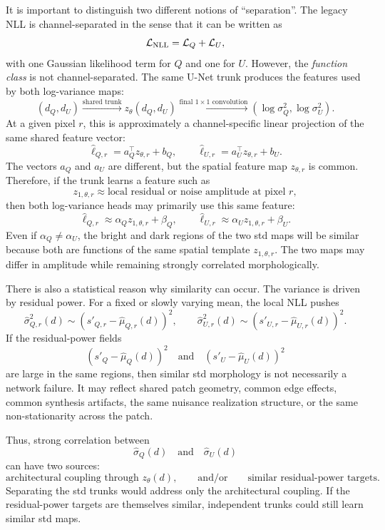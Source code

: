 \documentclass[11pt]{article}
\newcommand{\mean}{\mu}
\newcommand{\logvar}{\ell}
\newcommand{\std}{\sigma}
\newcommand{\pix}{r}
\begin{document}
It is important to distinguish two different notions of ``separation''.  The
legacy NLL is channel-separated in the sense that it can be written as
\[
  \mathcal{L}_{\rm NLL}
  =
  \mathcal{L}_{Q}
  +
  \mathcal{L}_{U},
\]
with one Gaussian likelihood term for \(Q\) and one for \(U\).  However, the
\emph{function class} is not channel-separated.  The same U-Net trunk produces
the features used by both log-variance maps:
\[
  (d_Q,d_U)
  \xrightarrow{\text{shared trunk}}
  z_\theta(d_Q,d_U)
  \xrightarrow{\text{final }1\times1\text{ convolution}}
  \left(
    \log \std_Q^2,
    \log \std_U^2
  \right).
\]
At a given pixel \(\pix\), this is approximately a channel-specific linear
projection of the same shared feature vector:
\[
  \widehat{\logvar}_{Q,\pix}
  =
  a_Q^\top z_{\theta,\pix} + b_Q,
  \qquad
  \widehat{\logvar}_{U,\pix}
  =
  a_U^\top z_{\theta,\pix} + b_U.
\]
The vectors \(a_Q\) and \(a_U\) are different, but the spatial feature map
\(z_{\theta,\pix}\) is common.  Therefore, if the trunk learns a feature such
as
\[
  z_{1,\theta,\pix}
  \approx
  \text{local residual or noise amplitude at pixel }\pix,
\]
then both log-variance heads may primarily use this same feature:
\[
  \widehat{\logvar}_{Q,\pix}
  \approx
  \alpha_Q z_{1,\theta,\pix}+\beta_Q,
  \qquad
  \widehat{\logvar}_{U,\pix}
  \approx
  \alpha_U z_{1,\theta,\pix}+\beta_U.
\]
Even if \(\alpha_Q\neq \alpha_U\), the bright and dark regions of the two std
maps will be similar because both are functions of the same spatial template
\(z_{1,\theta,\pix}\).  The two maps may differ in amplitude while remaining
strongly correlated morphologically.

There is also a statistical reason why similarity can occur.  The variance is
driven by residual power.  For a fixed or slowly varying mean, the local NLL
pushes
\[
  \widehat{\std}_{Q,\pix}^2(d)
  \sim
  \left(s'_{Q,\pix}-\widehat{\mean}_{Q,\pix}(d)\right)^2,
  \qquad
  \widehat{\std}_{U,\pix}^2(d)
  \sim
  \left(s'_{U,\pix}-\widehat{\mean}_{U,\pix}(d)\right)^2.
\]
If the residual-power fields
\[
  \left(s'_Q-\widehat{\mean}_Q(d)\right)^2
  \quad\text{and}\quad
  \left(s'_U-\widehat{\mean}_U(d)\right)^2
\]
are large in the same regions, then similar std morphology is not necessarily a
network failure.  It may reflect shared patch geometry, common edge effects,
common synthesis artifacts, the same nuisance realization structure, or the
same non-stationarity across the patch.

Thus, strong correlation between
\[
  \widehat{\std}_Q(d)
  \quad\text{and}\quad
  \widehat{\std}_U(d)
\]
can have two sources:
\[
  \text{architectural coupling through }z_\theta(d),
  \qquad
  \text{and/or}
  \qquad
  \text{similar residual-power targets}.
\]
Separating the std trunks would address only the architectural coupling.  If
the residual-power targets are themselves similar, independent trunks could
still learn similar std maps.
\end{document}
